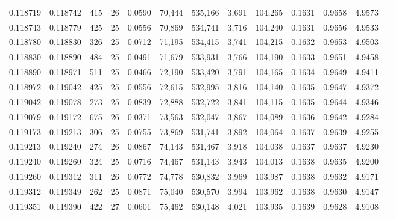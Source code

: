 \begin{tabular}{rrrrrrrrrrrrr}
0.118719 & 0.118742 & 415 &  26 &                                     0.0590 &  70,444 & 535,166 &   3,691 & 104,265 & 0.1631 & 0.9658 & 4.9573 \\
0.118743 & 0.118779 & 425 &  25 &                                     0.0556 &  70,869 & 534,741 &   3,716 & 104,240 & 0.1631 & 0.9656 & 4.9533 \\
0.118780 & 0.118830 & 326 &  25 &                                     0.0712 &  71,195 & 534,415 &   3,741 & 104,215 & 0.1632 & 0.9653 & 4.9503 \\
0.118830 & 0.118890 & 484 &  25 &                                     0.0491 &  71,679 & 533,931 &   3,766 & 104,190 & 0.1633 & 0.9651 & 4.9458 \\
0.118890 & 0.118971 & 511 &  25 &                                     0.0466 &  72,190 & 533,420 &   3,791 & 104,165 & 0.1634 & 0.9649 & 4.9411 \\
0.118972 & 0.119042 & 425 &  25 &                                     0.0556 &  72,615 & 532,995 &   3,816 & 104,140 & 0.1635 & 0.9647 & 4.9372 \\
0.119042 & 0.119078 & 273 &  25 &                                     0.0839 &  72,888 & 532,722 &   3,841 & 104,115 & 0.1635 & 0.9644 & 4.9346 \\
0.119079 & 0.119172 & 675 &  26 &                                     0.0371 &  73,563 & 532,047 &   3,867 & 104,089 & 0.1636 & 0.9642 & 4.9284 \\
0.119173 & 0.119213 & 306 &  25 &                                     0.0755 &  73,869 & 531,741 &   3,892 & 104,064 & 0.1637 & 0.9639 & 4.9255 \\
0.119213 & 0.119240 & 274 &  26 &                                     0.0867 &  74,143 & 531,467 &   3,918 & 104,038 & 0.1637 & 0.9637 & 4.9230 \\
0.119240 & 0.119260 & 324 &  25 &                                     0.0716 &  74,467 & 531,143 &   3,943 & 104,013 & 0.1638 & 0.9635 & 4.9200 \\
0.119260 & 0.119312 & 311 &  26 &                                     0.0772 &  74,778 & 530,832 &   3,969 & 103,987 & 0.1638 & 0.9632 & 4.9171 \\
0.119312 & 0.119349 & 262 &  25 &                                     0.0871 &  75,040 & 530,570 &   3,994 & 103,962 & 0.1638 & 0.9630 & 4.9147 \\
0.119351 & 0.119390 & 422 &  27 &                                     0.0601 &  75,462 & 530,148 &   4,021 & 103,935 & 0.1639 & 0.9628 & 4.9108 \\

\end{tabular}
